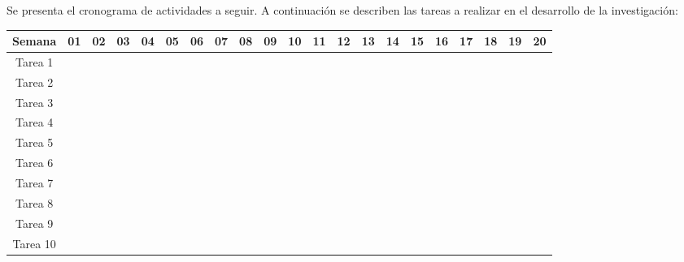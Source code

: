 Se presenta el cronograma de actividades a seguir. A continuación se describen las tareas a realizar en el desarrollo de la investigación:
\begin{center}
\begin{footnotesize}
\begingroup
\setlength{\tabcolsep}{8pt} %
\renewcommand{\arraystretch}{1.3} %
\begin{tabular}{|c|c|c|c|c|c|c|c|c|c|c|c|c|c|c|c|c|c|c|c|c|}
\hline
\textbf{Semana} & \textbf{01} & \textbf{02} & \textbf{03} & \textbf{04} & \textbf{05} & \textbf{06} & \textbf{07} & \textbf{08} & \textbf{09} & \textbf{10} & \textbf{11} & \textbf{12} & \textbf{13} & \textbf{14} & \textbf{15} & \textbf{16} & \textbf{17} & \textbf{18} & \textbf{19} & \textbf{20}\\ \hline
Tarea 1 & \cellcolor{gray}	& \cellcolor{gray}	& \cellcolor{gray}	& \cellcolor{gray}	& \cellcolor{gray}	& \cellcolor{gray}	& \cellcolor{gray}	& \cellcolor{gray}	& \cellcolor{gray}	& \cellcolor{gray}	& \cellcolor{gray}	& \cellcolor{gray}	& \cellcolor{gray}	& \cellcolor{gray}	& \cellcolor{gray}	& 	&	&	&	& 							  	  \\ \hline
Tarea 2 & \cellcolor{gray}	& 	& 	& 	&	&	&	&	&	&	&	&	&	&	&	&	&	&	&	& 	  \\ \hline
Tarea 3 &	& \cellcolor{gray}	& \cellcolor{gray}	& \cellcolor{gray}	& 	&	&	&	&	&	&	&	&	&	&	&	&	&	&	& \\ \hline
Tarea 4 &	&	&	& 	& \cellcolor{gray}	& \cellcolor{gray} 	&	&	&	&	&	&	&	&	&	&	&	&	&	& \\ \hline
Tarea 5 &	&	&	& 	& \cellcolor{gray}	& \cellcolor{gray}	& \cellcolor{gray}	&	&	&	&	&	&	&	&	&	&	&	&	& \\ \hline
Tarea 6 &	&	&	&	&	&	&	& \cellcolor{gray}	& \cellcolor{gray}	&	&	&	&	&	&	&	&	&	&	& \\ \hline
Tarea 7 &	&	&	&	&	& 	& 	& \cellcolor{gray}	& \cellcolor{gray}	& \cellcolor{gray}	&	&	&	&	&	&	&	&	&	& \\ \hline
Tarea 8 &	&	&	&	&	&	&	& 	& 	& 	& \cellcolor{gray}	&	\cellcolor{gray} &	&	&	&	&	&	&	& \\ \hline
Tarea 9 & 	&	&	&	&	&	&	&	&	&	& 	&  	& \cellcolor{gray}	& \cellcolor{gray}	& \cellcolor{gray}	&	&	&	&	& \\ \hline
Tarea 10 & 	&	&	&	&	&	&	&	&	&	&	& 	&	& 	& 	& \cellcolor{gray}	& \cellcolor{gray}	& \cellcolor{gray}	& \cellcolor{gray}	& \cellcolor{gray} \\ \hline
\end{tabular}
\endgroup
\end{footnotesize}
\end{center}

